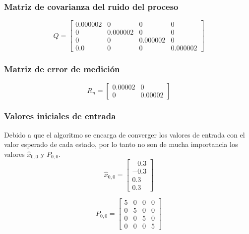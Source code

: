 		\subsubsection*{Matriz de covarianza del ruido del proceso}
\begin{equation}
Q = \begin{bmatrix}
0.000002 & 0 & 0 & 0\\ 
0        & 0.000002 & 0        & 0\\ 
0        & 0        & 0.000002 & 0\\ 
0.0      & 0        & 0        & 0.000002
\end{bmatrix}
\label{eq:process_noise_matrix}
\end{equation}

		\subsubsection*{Matriz de error de medición}
\begin{equation}
R_n = \begin{bmatrix}
0.00002 & 0\\ 
0     & 0.00002
\end{bmatrix}
\label{eq:noise_measurement}
\end{equation}

		\subsubsection*{Valores iniciales de entrada}
		Debido a que el algoritmo se encarga de converger los valores de entrada con el valor esperado de cada estado, por lo tanto no son de mucha importancia los valores $\hat{x}_{0,0}$ y $P_{0,0}$.
\begin{equation}
\hat{x}_{0,0} = \begin{bmatrix}
-0.3\\ 
-0.3\\ 
0.3\\ 
0.3
\end{bmatrix}
\label{eq:initial_state_vector}
\end{equation}

\begin{equation}
P_{0,0} 
=
\begin{bmatrix}
5   & 0 & 0 & 0\\ 
0   & 5 & 0 & 0\\
0   & 0 & 5 & 0\\
0   & 0 & 0 & 5
\end{bmatrix}
\label{eq:initial_cov_vector}
\end{equation}	

